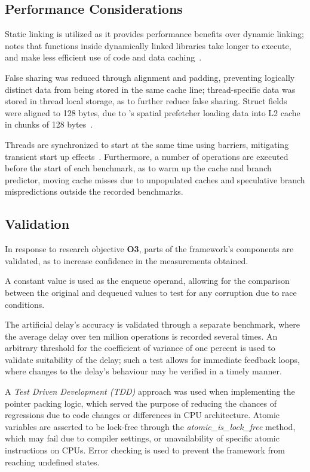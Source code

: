 \subsection{Performance Considerations}
Static linking is utilized as it provides performance benefits over dynamic
linking; \citeauthor{fog2020optimizing} notes that functions inside dynamically
linked libraries take longer to execute, and make less efficient use of code
and data caching~\citep[Section~14.11]{fog2020optimizing}.

False sharing was reduced through alignment and padding, preventing logically
distinct data from being stored in the same cache line;
thread-specific data was stored in thread local storage, as to further reduce
false sharing. Struct fields were aligned to 128 bytes, due to
\citeauthor{intelmanualoptimization}'s spatial prefetcher loading data into L2
cache in chunks of 128 bytes~\citep[Section~E.2.5.4]{intelmanualoptimization}.

Threads are synchronized to start at the same time using
barriers, mitigating transient start up effects~\citep{hoffman2007baskets}.
Furthermore, a number of operations are executed before the start of each
benchmark, as to warm up the cache and branch predictor, moving cache misses
due to unpopulated caches and speculative branch mispredictions outside the
recorded benchmarks.

\subsection{Validation}
In response to research objective \textbf{O3}, parts of the framework's
components are validated, as to increase confidence in the measurements
obtained.

A constant value is used as the enqueue operand, allowing for the comparison
between the original and dequeued values to test for any corruption due to race conditions. 

The artificial delay's accuracy is validated through a separate
benchmark,
where the average delay over ten million operations is recorded several times.
An arbitrary threshold for the coefficient of variance of one percent
is used to validate suitability of the delay; such a test allows
for immediate feedback loops, where changes to the delay's behaviour may
be verified in a timely manner.

A \emph{Test Driven Development (TDD)} approach was used when implementing the
pointer packing logic, which served the purpose of reducing the chances of
regressions due to code changes or differences in CPU architecture. Atomic
variables are asserted to be lock-free through the
\emph{atomic\_is\_lock\_free} method, which may fail due to compiler settings,
or unavailability of specific atomic instructions on CPUs. Error checking is
used to prevent the framework from reaching undefined states.
